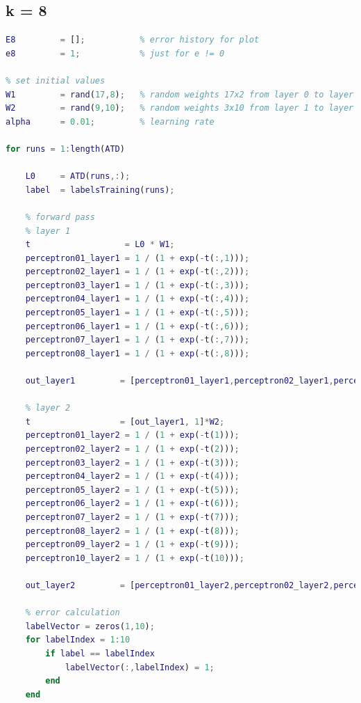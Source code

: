 \documentclass[12pt]{article}
\begin{document}
\subsection{k = 8}
\begin{lstlisting}[language=Matlab]
% k = 8, Training
E8         = [];           % error history for plot
e8         = 1;            % just for e != 0

% set initial values
W1         = rand(17,8);   % random weights 17x2 from layer 0 to layer 1
W2         = rand(9,10);   % random weights 3x10 from layer 1 to layer 2
alpha      = 0.01;         % learning rate

for runs = 1:length(ATD)
    
    L0     = ATD(runs,:);
    label  = labelsTraining(runs);
        
    % forward pass
    % layer 1
    t                   = L0 * W1;
    perceptron01_layer1 = 1 / (1 + exp(-t(:,1)));
    perceptron02_layer1 = 1 / (1 + exp(-t(:,2)));
    perceptron03_layer1 = 1 / (1 + exp(-t(:,3)));
    perceptron04_layer1 = 1 / (1 + exp(-t(:,4)));
    perceptron05_layer1 = 1 / (1 + exp(-t(:,5)));
    perceptron06_layer1 = 1 / (1 + exp(-t(:,6)));
    perceptron07_layer1 = 1 / (1 + exp(-t(:,7)));
    perceptron08_layer1 = 1 / (1 + exp(-t(:,8)));
    
    out_layer1         = [perceptron01_layer1,perceptron02_layer1,perceptron03_layer1,perceptron04_layer1,perceptron05_layer1,perceptron06_layer1,perceptron07_layer1,perceptron08_layer1];
    
    % layer 2
    t                  = [out_layer1, 1]*W2;
    perceptron01_layer2 = 1 / (1 + exp(-t(1)));
    perceptron02_layer2 = 1 / (1 + exp(-t(2)));
    perceptron03_layer2 = 1 / (1 + exp(-t(3)));
    perceptron04_layer2 = 1 / (1 + exp(-t(4)));
    perceptron05_layer2 = 1 / (1 + exp(-t(5)));
    perceptron06_layer2 = 1 / (1 + exp(-t(6)));
    perceptron07_layer2 = 1 / (1 + exp(-t(7)));
    perceptron08_layer2 = 1 / (1 + exp(-t(8)));
    perceptron09_layer2 = 1 / (1 + exp(-t(9)));
    perceptron10_layer2 = 1 / (1 + exp(-t(10)));
    
    out_layer2         = [perceptron01_layer2,perceptron02_layer2,perceptron03_layer2,perceptron04_layer2,perceptron05_layer2,perceptron06_layer2,perceptron07_layer2,perceptron08_layer2,perceptron09_layer2,perceptron10_layer2];
    
    % error calculation
    labelVector = zeros(1,10);
    for labelIndex = 1:10
        if label == labelIndex
            labelVector(:,labelIndex) = 1;
        end
    end


\end{lstlisting}
\end{document}
